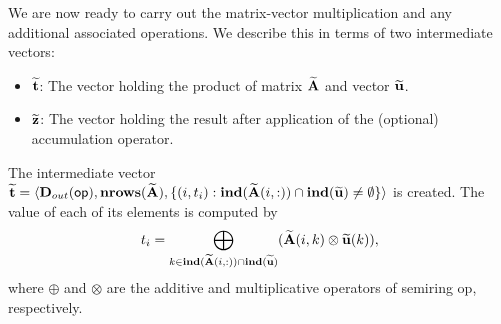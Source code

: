 We are now ready to carry out the matrix-vector multiplication and any additional 
associated operations.  We describe this in terms of two intermediate vectors:
\begin{itemize}
    \item ${\bf \widetilde{t}}$: The vector holding the product of matrix 
    ${\bf \widetilde{A}}$ and vector ${\bf \widetilde{u}}$.
    \item ${\bf \widetilde{z}}$: The vector holding the result after 
    application of the (optional) accumulation operator.
\end{itemize}

The intermediate vector ${\bf \widetilde{t}} = \langle
\mbox{$\mathbf{D}_{out}$}({\sf op}), \bold{nrows}({\bf \widetilde{A}}),
\{(i,t_i) : \bold{ind}({\bf \widetilde{A}}(i,:)) \cap 
\bold{ind}({\bf \widetilde{u}}) \neq \emptyset \} \rangle$
is created.  The value of each of its elements is computed by 
\[t_i = \bigoplus_{k \in \bold{ind}({\bf \widetilde{A}}(i,:)) \cap
\bold{ind}({\bf \widetilde{u}})} ({\bf \widetilde{A}}(i,k)
\otimes {\bf \widetilde{u}}(k)),\] where $\oplus$ and $\otimes$
are the additive and multiplicative operators of semiring {\sf op},
respectively.





